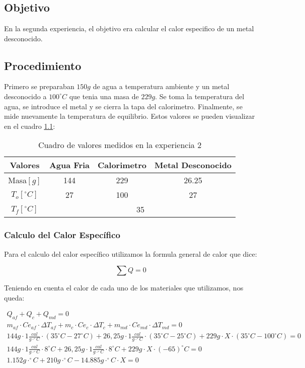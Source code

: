 \documentclass[12pt]{report}
\begin{document}
\chapter{}
\section{Objetivo}
En la segunda experiencia, el objetivo era calcular el calor especifico de un metal desconocido.

\section{Procedimiento}
Primero se preparaban $150 g$ de agua a temperatura ambiente y un metal desconocido a $100^\circ C$ que tenia una masa de $229 g$. Se toma la temperatura del agua, se introduce el metal y se cierra la tapa del calorimetro. Finalmente, se mide nuevamente la temperatura de equilibrio.
Estos valores se pueden visualizar en el cuadro \ref{table:data}:

\begin{table}[h!]
\centering
\begin{tabular}{|c|c|c|c|}
    \hline
    Valores & Agua Fria & Calorimetro & Metal Desconocido \\
    \hline
    Masa$[g]$ & 144 & 229 & 26.25 \\
    \hline
    $T_o [^\circ C]$ & 27 & 100 & 27 \\
    \hline
    $T_f [^\circ C]$ & \multicolumn{3}{|c|}{35}\\
    \hline
\end{tabular}
\caption{Cuadro de valores medidos en la experiencia 2}
\label{table:data}
\end{table}

\subsection{Calculo del Calor Específico}

Para el calculo del calor específico utilizamos la formula general de calor que dice:

$$\sum Q = 0$$

\noindent
Teniendo en cuenta el calor de cada uno de los materiales que utilizamos, nos queda:

\tiny{
\begin{eqnarray*}
Q_{af} + Q_c + Q_{md} = 0 \\
m_{af} \cdot Ce_{af} \cdot \Delta T_{af} + m_c \cdot Ce_c \cdot \Delta T_c + m_{md} \cdot Ce_{md} \cdot \Delta T_{md} = 0 \\
144g \cdot 1 \frac{cal}{g\cdot^\circ C} \cdot (35^\circ C - 27^\circ C) + 26,25g \cdot 1 \frac{cal}{g\cdot^\circ C} \cdot (35^\circ C - 25^\circ C) + 229g \cdot X \cdot (35^\circ C - 100^\circ C) = 0 \\
144g \cdot 1 \frac{cal}{g\cdot^\circ C} \cdot 8^\circ C + 26,25g \cdot 1 \frac{cal}{g\cdot^\circ C} \cdot 8^\circ C + 229g \cdot X \cdot (-65)^\circ C = 0 \\
1.152 g\cdot^\circ C + 210 g\cdot^\circ C - 14.885 g\cdot^\circ C \cdot X = 0
\end{eqnarray*}
}
\end{document}
